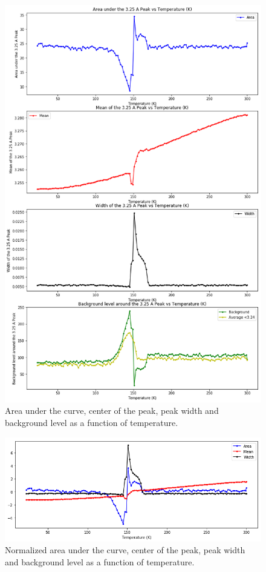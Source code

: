 	\begin{figure}[h]
	\centering
	\includegraphics[scale=0.25]{../figs/3p25.png}	
	\caption{Area under the curve, center of the peak, peak width and background level as a function of temperature.}
	\label{fig:peak3p25}
	\end{figure}

	\begin{figure}[h]
	\centering
	\includegraphics[scale=0.25]{../figs/norm.png}	
	\caption{Normalized area under the curve, center of the peak, peak width and background level as a function of temperature.}
	\label{fig:norm}
	\end{figure}
